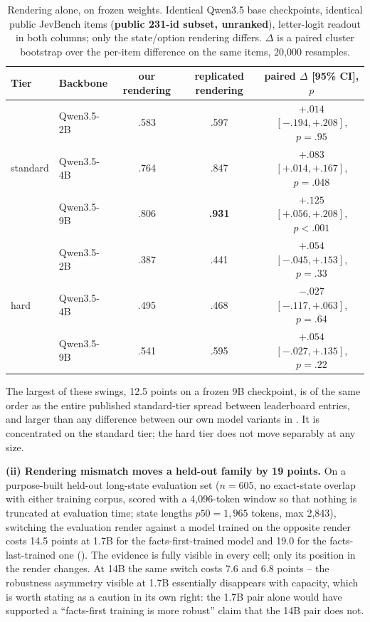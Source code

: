 \begin{table}[t]
  \centering
  \caption{Rendering alone, on frozen weights. Identical Qwen3.5 base checkpoints, identical public
  JevBench items (\textbf{public 231-id subset, unranked}), letter-logit readout in both columns; only
  the state/option rendering differs. $\Delta$ is a paired cluster bootstrap over the per-item
  difference on the same items, 20{,}000 resamples.}
  \label{tab:rendering}
  \small
  \begin{tabular}{llccc}
    \toprule
    Tier & Backbone & our rendering & replicated rendering & paired $\Delta$ [95\% CI], $p$ \\
    \midrule
    \multirow{3}{*}{standard} & Qwen3.5-2B & .583 & .597 & $+.014$ $[-.194, +.208]$, $p{=}.95$ \\
     & Qwen3.5-4B & .764 & .847 & $+.083$ $[+.014, +.167]$, $p{=}.048$ \\
     & Qwen3.5-9B & .806 & \textbf{.931} & $\mathbf{+.125}$ $[+.056, +.208]$, $p{<}.001$ \\
    \midrule
    \multirow{3}{*}{hard} & Qwen3.5-2B & .387 & .441 & $+.054$ $[-.045, +.153]$, $p{=}.33$ \\
     & Qwen3.5-4B & .495 & .468 & $-.027$ $[-.117, +.063]$, $p{=}.64$ \\
     & Qwen3.5-9B & .541 & .595 & $+.054$ $[-.027, +.135]$, $p{=}.22$ \\
    \bottomrule
  \end{tabular}
\end{table}

The largest of these swings, 12.5 points on a frozen 9B checkpoint, is of the same order as the entire
published standard-tier spread between leaderboard entries, and larger than any difference between our
own model variants in . It is concentrated on the standard tier; the hard tier does
not move separably at any size.

\textbf{(ii) Rendering mismatch moves a held-out family by 19 points.} On a purpose-built held-out
long-state evaluation set ($n{=}605$, no exact-state overlap with either training corpus, scored with a
4{,}096-token window so that nothing is truncated at evaluation time; state lengths $p50 = 1{,}965$
tokens, max 2{,}843), switching the evaluation render against a model trained on the opposite render
costs 14.5 points at 1.7B for the facts-first-trained model and 19.0 for the facts-last-trained one
(). The evidence is fully visible in every cell; only its position in the render
changes. At 14B the same switch costs 7.6 and 6.8 points -- the robustness asymmetry visible at 1.7B
essentially disappears with capacity, which is worth stating as a caution in its own right: the 1.7B
pair alone would have supported a ``facts-first training is more robust'' claim that the 14B pair does
not.

